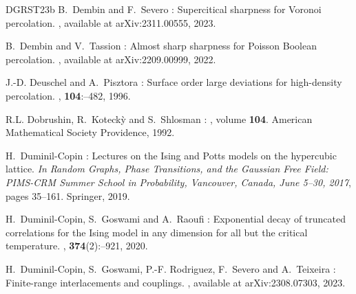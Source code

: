 \documentclass[11pt,a4paper]{article}
\theoremstyle{definition}
\numberwithin{equation}{section}
\begin{document}
\begin{thebibliography}{DGRST23b}
B.~\bgroup\fonteauteurs\bgroup Dembin\egroup\egroup{} and F.~\bgroup\fonteauteurs\bgroup Severo\egroup\egroup{} :
\newblock Supercitical sharpness for {V}oronoi percolation.
, available at arXiv:2311.00555, 2023.

B.~\bgroup\fonteauteurs\bgroup Dembin\egroup\egroup{} and V.~\bgroup\fonteauteurs\bgroup Tassion\egroup\egroup{} :
\newblock Almost sharp sharpness for {P}oisson {B}oolean percolation.
, available at arXiv:2209.00999, 2022.

J.-D. \bgroup\fonteauteurs\bgroup Deuschel\egroup\egroup{} and A.~\bgroup\fonteauteurs\bgroup Pisztora\egroup\egroup{} :
\newblock Surface order large deviations for high-density percolation.
, \textbf{104}\string:--482, 1996.




R.L. \bgroup\fonteauteurs\bgroup Dobrushin\egroup\egroup{}, R.~\bgroup\fonteauteurs\bgroup Koteck{\`y}\egroup\egroup{} and S.~\bgroup\fonteauteurs\bgroup Shlosman\egroup\egroup{} :
, volume \textbf{104}.
\newblock American Mathematical Society Providence, 1992.



H.~\bgroup\fonteauteurs\bgroup Duminil-Copin\egroup\egroup{} :
\newblock Lectures on the {I}sing and {P}otts models on the hypercubic lattice.
\newblock \emph{In} {\em Random Graphs, Phase Transitions, and the Gaussian Free Field: PIMS-CRM Summer School in Probability, Vancouver, Canada, June 5--30, 2017}, pages 35--161. Springer, 2019.

H.~\bgroup\fonteauteurs\bgroup Duminil-Copin\egroup\egroup{}, S.~\bgroup\fonteauteurs\bgroup Goswami\egroup\egroup{} and A.~\bgroup\fonteauteurs\bgroup Raoufi\egroup\egroup{} :
\newblock Exponential decay of truncated correlations for the {I}sing model in any dimension for all but the critical temperature.
, \textbf{374}(2)\string:--921, 2020.

H.~\bgroup\fonteauteurs\bgroup Duminil-Copin\egroup\egroup{}, S.~\bgroup\fonteauteurs\bgroup Goswami\egroup\egroup{}, P.-F. \bgroup\fonteauteurs\bgroup Rodriguez\egroup\egroup{}, F.~\bgroup\fonteauteurs\bgroup Severo\egroup\egroup{} and A.~\bgroup\fonteauteurs\bgroup Teixeira\egroup\egroup{} :
\newblock Finite-range interlacements and couplings.
, available at arXiv:2308.07303, 2023.


\end{thebibliography}
\end{document}
